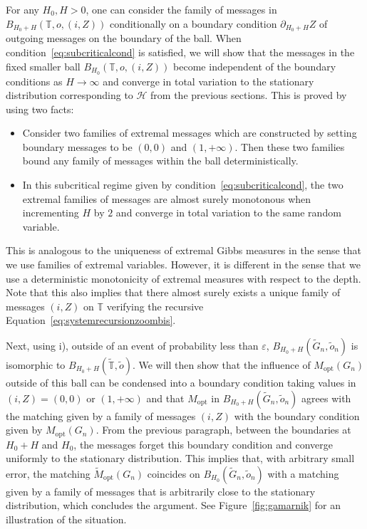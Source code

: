 \documentclass[11pt]{article}
\newcommand{\eps}{\varepsilon}
\begin{document}
For any $H_0,H>0$, one can consider the family of messages in $B_{H_0+H}(\mathbb{T},o, (i,Z))$ conditionally on a boundary condition $\partial_{H_0+H} Z$ of outgoing messages on the boundary of the ball. When condition~\ref{eq:subcriticalcond} is satisfied, we will show that the messages in the fixed smaller ball $B_{H_0} (\mathbb{T},o, (i,Z))$ become independent of the boundary conditions as $H \rightarrow \infty$ and converge in total variation to the stationary distribution corresponding to $\mathcal{H}$ from the previous sections. This is proved by using two facts:
\begin{itemize}
    \item Consider two families of extremal messages which are constructed by setting boundary messages to be $(0,0)$ and $(1,+\infty)$. Then these two families bound any family of messages within the ball deterministically.
    \item In this subcritical regime given by condition~\eqref{eq:subcriticalcond}, the two extremal families of messages are almost surely monotonous when incrementing $H$ by $2$ and converge in total variation to the same random variable.
\end{itemize}
This is analogous to the uniqueness of extremal Gibbs measures in the sense that we use families of extremal variables. However, it is different in the sense that we use a deterministic monotonicity of extremal measures with respect to the depth. Note that this also implies that there almost surely exists a unique family of messages $(i,Z)$ on $\mathbb{T}$ verifying the recursive Equation~\eqref{eq:systemrecursionzoombis}.

Next, using i), outside of an event of probability less than $\eps$, $B_{H_0+H}(\tilde{G}_n,\tilde{o}_n)$ is isomorphic to $B_{H_0+H}(\tilde{\mathbb{T}},\tilde{o})$. We will then show that the influence of $M_{\mathrm{opt}}(G_n)$ outside of this ball can be condensed into a boundary condition taking values in $(i,Z)=(0,0)$ or $(1,+\infty)$ and that $M_{\mathrm{opt}}$ in $B_{H_0+H}(\tilde{G}_n,\tilde{o}_n)$ agrees with the matching given by a family of messages $(i,Z)$ with the boundary condition given by $M_{\mathrm{opt}}(G_n)$. From the previous paragraph, between the boundaries at $H_0+H$ and $H_0$, the messages forget this boundary condition and 
converge uniformly to the stationary distribution. This implies that, with arbitrary small error, the matching $\tilde{M}_{\mathrm{opt}}(G_n)$ coincides on $B_{H_0}(\tilde{G}_n,\tilde{o}_n)$ with a matching given by a family of messages that is arbitrarily close to the stationary distribution, which concludes the argument. See Figure~\ref{fig:gamarnik} for an illustration of the situation.
\end{document}
